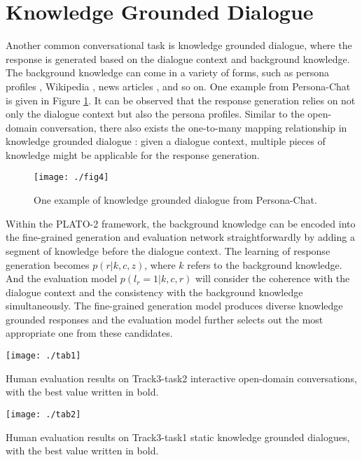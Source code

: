 \documentclass[letterpaper]{article} \usepackage{aaai21}  \usepackage{times}  \usepackage{helvet} \usepackage{courier}  \usepackage[hyphens]{url}  \usepackage{graphicx} \urlstyle{rm} \def\UrlFont{\rm}  \usepackage{natbib}  \usepackage{caption} \frenchspacing  \setlength{\pdfpagewidth}{8.5in}  \setlength{\pdfpageheight}{11in}  \usepackage{amsmath}
\begin{document}
\section{Knowledge Grounded Dialogue}
Another common conversational task is knowledge grounded dialogue, where the response is generated based on the dialogue context and background knowledge. The background knowledge can come in a variety of forms, such as persona profiles \cite{zhang2018personalizing}, Wikipedia \cite{dinan2018wizard}, news articles \cite{gopalakrishnan2019topical}, and so on. One example from Persona-Chat is given in Figure \ref{fig:persona}. It can be observed that the response generation relies on not only the dialogue context but also the persona profiles. Similar to the open-domain conversation, there also exists the one-to-many mapping relationship in knowledge grounded dialogue \cite{kim2019sequential}: given a dialogue context, multiple pieces of knowledge might be applicable for the response generation. 
\begin{figure}
	\centering
	\texttt{[image: ./fig4]}
	\caption{One example of knowledge grounded dialogue from Persona-Chat.}
	\label{fig:persona}
\end{figure} 

Within the PLATO-2 framework, the background knowledge can be encoded into the fine-grained generation and evaluation network straightforwardly by adding a segment of knowledge before the dialogue context. The learning of response generation becomes $p(r|k,c,z)$, where $k$ refers to the background knowledge. And the evaluation model $p(l_r=1|k,c,r)$ will consider the coherence with the dialogue context and the consistency with the background knowledge simultaneously. The fine-grained generation model produces diverse knowledge grounded responses and the evaluation model further selects out the most appropriate one from these candidates. 

\begin{table*}
	\centering
	\texttt{[image: ./tab1]}
	\caption{Human evaluation results on Track3-task2 interactive open-domain conversations, with the best value written in bold.}
	\label{tab:chat}
\end{table*} 
\begin{table*}
	\centering
	\texttt{[image: ./tab2]}
	\caption{Human evaluation results on Track3-task1 static knowledge grounded dialogues, with the best value written in bold.}
	\label{tab:knowledge}
\end{table*} 
\end{document}
